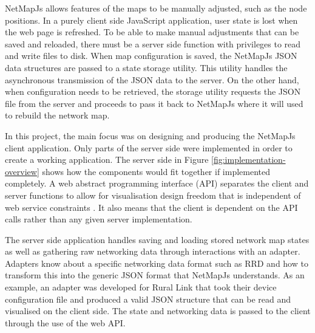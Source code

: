 \documentclass[11pt, a4paper]{article}
\begin{document}
NetMapJs allows features of the maps to be manually adjusted, such as the node
positions. In a purely client side JavaScript application, user state is lost
when the web page is refreshed. To be able to make manual adjustments that can
be saved and reloaded, there must be a server side function with privileges to
read and write files to disk. When map configuration is saved, the NetMapJs JSON
data structures are passed to a state storage utility. This utility handles the
asynchronous transmission of the JSON data to the server. On the other hand,
when configuration needs to be retrieved, the storage utility requests the JSON
file from the server and proceeds to pass it back to NetMapJs where it will used
to rebuild the network map.

In this project, the main focus was on designing and producing the NetMapJs
client application. Only parts of the server side were implemented in order to
create a working application. The server side in Figure
\ref{fig:implementation-overview} shows how the components would fit together if
implemented completely. A web abstract programming interface (API) separates the
client and server functions to allow for visualisation design freedom that is
independent of web service constraints \cite{Wood_2008}. It also means that the
client is dependent on the API calls rather than any given server implementation.

The server side application handles saving and loading stored network map states
as well as gathering raw networking data through interactions with an adapter.
Adapters know about a specific networking data format such as RRD and how to
transform this into the generic JSON format that NetMapJs understands. As an
example, an adapter was developed for Rural Link that took their device
configuration file and produced a valid JSON structure that can be read and
visualised on the client side. The state and networking data is passed to the
client through the use of the web API.
\end{document}
